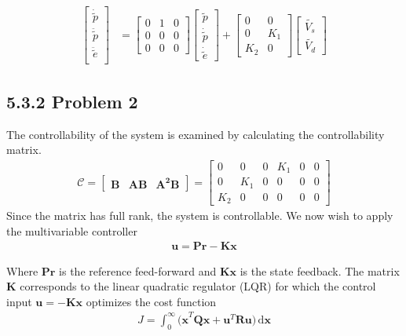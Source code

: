 \begin{align*}
\begin{bmatrix}
    \dot{\tilde{p}}\\
    \ddot{\tilde{p}}\\
    \ddot{\tilde{e}}\\
\end{bmatrix} &= 
\begin{bmatrix}
    0 & 1 & 0\\
    0 & 0 & 0\\
    0 & 0 & 0
\end{bmatrix}
\begin{bmatrix}
    \tilde{p}\\
    \dot{\tilde{p}}\\
    \dot{\tilde{e}}
\end{bmatrix} +
\begin{bmatrix}
    0 & 0\\
    0 & K_1\\
    K_2 & 0
\end{bmatrix}
\begin{bmatrix}
    \tilde{V_s}\\
    \tilde{V_d}
\end{bmatrix}
\end{align*}


\newpage
{}
\subsection*{5.3.2 Problem 2}
The controllability of the system is examined by calculating the controllability matrix.
\begin{align*}
\mathcal{C} = 
\begin{bmatrix}
\mathbf{B} & \mathbf{AB} & \mathbf{A^2B}
\end{bmatrix} = 
\begin{bmatrix}
0 & 0 & 0 & K_1 & 0 & 0\\
0 & K_1 & 0 & 0 & 0 & 0\\
K_2 & 0 & 0 & 0 & 0 & 0
\end{bmatrix}
\end{align*}
Since the matrix has full rank, the system is controllable. We now wish to apply the multivariable controller
\begin{align*}
\mathbf{u = Pr - Kx}
\end{align*}

Where $\mathbf{Pr}$ is the reference feed-forward and $\mathbf{Kx}$ is the state feedback. The matrix $\mathbf{K}$ corresponds to the linear quadratic regulator (LQR) for which the control input $\mathbf{u =- Kx}$ optimizes the cost function
\begin{align*}
        J = \int_0^\infty\! \mathbf{(x}^T\mathbf{Qx} + \mathbf{u}^T\mathbf{Ru)\, \mathrm{d}x}
\end{align*}

